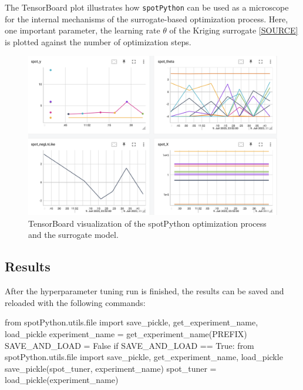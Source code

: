 \documentclass[
  letterpaper,
  DIV=11,
  numbers=noendperiod]{scrreprt}
\newenvironment{Shaded}{\begin{snugshade}}{\end{snugshade}}
\newcommand{\BuiltInTok}[1]{\textcolor[rgb]{0.00,0.23,0.31}{#1}}
\newcommand{\ControlFlowTok}[1]{\textcolor[rgb]{0.00,0.23,0.31}{#1}}
\newcommand{\ImportTok}[1]{\textcolor[rgb]{0.00,0.46,0.62}{#1}}
\newcommand{\NormalTok}[1]{\textcolor[rgb]{0.00,0.23,0.31}{#1}}
\newcommand{\OperatorTok}[1]{\textcolor[rgb]{0.37,0.37,0.37}{#1}}
\newcommand{\VariableTok}[1]{\textcolor[rgb]{0.07,0.07,0.07}{#1}}
\begin{document}
The TensorBoard plot illustrates how \texttt{spotPython} can be used as
a microscope for the internal mechanisms of the surrogate-based
optimization process. Here, one important parameter, the learning rate
\(\theta\) of the Kriging surrogate
\href{https://github.com/sequential-parameter-optimization/spotPython/blob/main/src/spotPython/build/kriging.py}{{[}SOURCE{]}}
is plotted against the number of optimization steps.

\begin{figure}[H]

{\centering \includegraphics[width=1\textwidth,height=\textheight]{figures_static/13_tensorboard_01.png}

}

\caption{TensorBoard visualization of the spotPython optimization
process and the surrogate model.}

\end{figure}%

\subsection{Results}\label{results-8}

After the hyperparameter tuning run is finished, the results can be
saved and reloaded with the following commands:

\begin{Shaded}
\begin{Highlighting}[]
\ImportTok{from}\NormalTok{ spotPython.utils.}\BuiltInTok{file} \ImportTok{import}\NormalTok{ save\_pickle, get\_experiment\_name,  load\_pickle}
\NormalTok{experiment\_name }\OperatorTok{=}\NormalTok{ get\_experiment\_name(PREFIX)}
\NormalTok{SAVE\_AND\_LOAD }\OperatorTok{=} \VariableTok{False}
\ControlFlowTok{if}\NormalTok{ SAVE\_AND\_LOAD }\OperatorTok{==} \VariableTok{True}\NormalTok{:}
    \ImportTok{from}\NormalTok{ spotPython.utils.}\BuiltInTok{file} \ImportTok{import}\NormalTok{ save\_pickle, get\_experiment\_name,  load\_pickle}
\NormalTok{    save\_pickle(spot\_tuner, experiment\_name)}
\NormalTok{    spot\_tuner }\OperatorTok{=}\NormalTok{ load\_pickle(experiment\_name)}
\end{Highlighting}
\end{Shaded}
\end{document}
